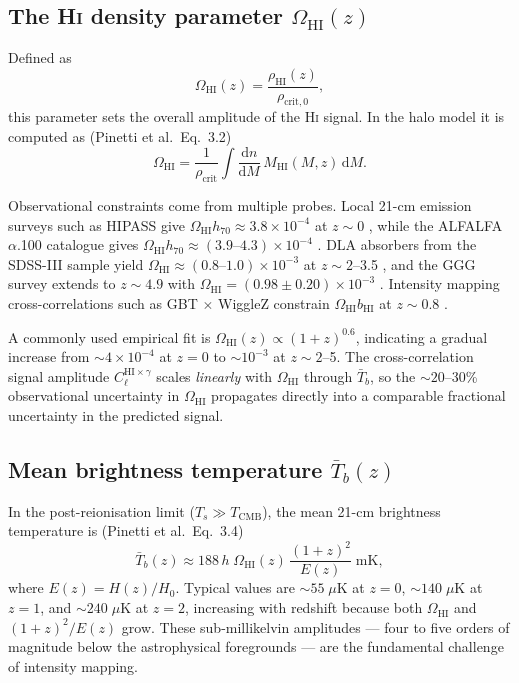 \documentclass[10pt,a4paper]{article}
\newcommand{\OmHI}{\Omega_{\mathrm{HI}}}
\newcommand{\bHI}{b_{\mathrm{HI}}}
\newcommand{\Tbar}{\bar{T}_b}
\newcommand{\MHI}{M_{\mathrm{HI}}}
\newcommand{\rhocrit}{\rho_{\mathrm{crit}}}
\newcommand{\rhoHI}{\rho_{\mathrm{HI}}}
\begin{document}
\subsection{The H\textsc{i} density parameter \texorpdfstring{$\OmHI(z)$}{Omega\_HI(z)}}

Defined as
\begin{equation}
  \label{eq:OmHI}
  \OmHI(z) = \frac{\rhoHI(z)}{\rho_{\mathrm{crit},0}},
\end{equation}
this parameter sets the overall amplitude of the H\textsc{i} signal.  In the
halo model it is computed as (Pinetti et al.\ Eq.~3.2)
\begin{equation}
  \label{eq:OmHI-halomodel}
  \OmHI = \frac{1}{\rhocrit}
  \int \frac{\mathrm{d}n}{\mathrm{d}M}\,\MHI(M,z)\,\mathrm{d}M.
\end{equation}

Observational constraints come from multiple probes.  Local 21-cm emission
surveys such as HIPASS give $\OmHI h_{70} \approx 3.8 \times 10^{-4}$ at
$z \sim 0$ \citep{Zwaan2005}, while the ALFALFA $\alpha$.100 catalogue gives
$\OmHI h_{70} \approx (3.9\text{--}4.3) \times 10^{-4}$ \citep{Jones2018}.
DLA absorbers from the SDSS-III sample yield
$\OmHI \approx (0.8\text{--}1.0) \times 10^{-3}$ at $z \sim 2$--3.5
\citep{Noterdaeme2012}, and the GGG survey extends to $z \sim 4.9$ with
$\OmHI = (0.98 \pm 0.20) \times 10^{-3}$ \citep{Crighton2015}.  Intensity
mapping cross-correlations such as GBT $\times$ WiggleZ constrain
$\OmHI \bHI$ at $z \sim 0.8$ \citep{Switzer2013,Masui2013}.

A commonly used empirical fit is $\OmHI(z) \propto (1+z)^{0.6}$, indicating
a gradual increase from $\sim\!4 \times 10^{-4}$ at $z=0$ to
$\sim\!10^{-3}$ at $z \sim 2$--5.  The cross-correlation signal amplitude
$C_\ell^{\mathrm{HI}\times\gamma}$ scales \emph{linearly} with $\OmHI$
through $\Tbar$, so the $\sim\!20$--30\% observational uncertainty in $\OmHI$
propagates directly into a comparable fractional uncertainty in the predicted
signal.


\subsection{Mean brightness temperature \texorpdfstring{$\Tbar(z)$}{Tbar(z)}}

In the post-reionisation limit ($T_s \gg T_{\mathrm{CMB}}$), the mean 21-cm
brightness temperature is (Pinetti et al.\ Eq.~3.4)
\begin{equation}
  \label{eq:Tbar}
  \boxed{
  \Tbar(z) \approx 188\,h\;\OmHI(z)\,
  \frac{(1+z)^{2}}{E(z)}\;\mathrm{mK},
  }
\end{equation}
where $E(z) = H(z)/H_0$.  Typical values are $\sim\!55\;\mu\mathrm{K}$ at
$z = 0$, $\sim\!140\;\mu\mathrm{K}$ at $z = 1$, and
$\sim\!240\;\mu\mathrm{K}$ at $z = 2$, increasing with redshift because both
$\OmHI$ and $(1+z)^{2}/E(z)$ grow.  These sub-millikelvin amplitudes --- four
to five orders of magnitude below the astrophysical foregrounds --- are the
fundamental challenge of intensity mapping.
\end{document}
